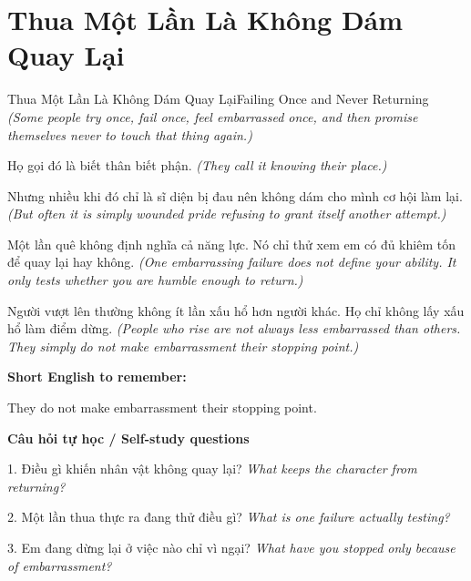 \section{Thua Một Lần Là Không Dám Quay Lại}
\begin{truyen}{Thua Một Lần Là Không Dám Quay Lại}{Failing Once and Never Returning}
\textit{(Some people try once, fail once, feel embarrassed once, and then promise themselves never to touch that thing again.)}

Họ gọi đó là biết thân biết phận.
\textit{(They call it knowing their place.)}

Nhưng nhiều khi đó chỉ là sĩ diện bị đau nên không dám cho mình cơ hội làm lại.
\textit{(But often it is simply wounded pride refusing to grant itself another attempt.)}

Một lần quê không định nghĩa cả năng lực. Nó chỉ thử xem em có đủ khiêm tốn để quay lại hay không.
\textit{(One embarrassing failure does not define your ability. It only tests whether you are humble enough to return.)}

\end{truyen}

\begin{baihoc}
Người vượt lên thường không ít lần xấu hổ hơn người khác. Họ chỉ không lấy xấu hổ làm điểm dừng.
\textit{(People who rise are not always less embarrassed than others. They simply do not make embarrassment their stopping point.)}
\end{baihoc}

\begin{ghinhoanh}
\textbf{Short English to remember:}

They do not make embarrassment their stopping point.

\end{ghinhoanh}

\begin{tuhocnhanh}
\textbf{Câu hỏi tự học / Self-study questions}

1. Điều gì khiến nhân vật không quay lại? \textit{What keeps the character from returning?}

2. Một lần thua thực ra đang thử điều gì? \textit{What is one failure actually testing?}

3. Em đang dừng lại ở việc nào chỉ vì ngại? \textit{What have you stopped only because of embarrassment?}
\end{tuhocnhanh}
\ngancach


